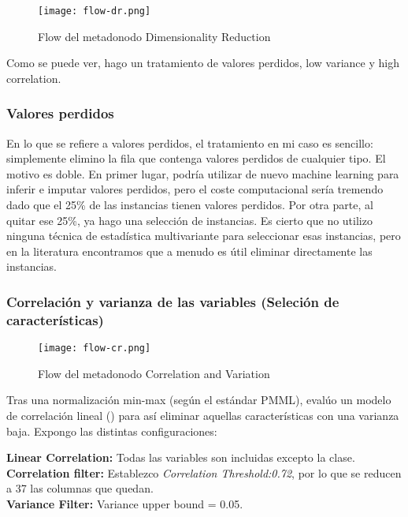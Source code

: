 \begin{figure}[H] %
	\centering
	\texttt{[image: flow-dr.png]}  %
	\caption{Flow del metadonodo Dimensionality Reduction} 
	\label{fig:flow-dr}
\end{figure}

Como se puede ver, hago un tratamiento de valores perdidos, low variance y high correlation.

\subsubsection{Valores perdidos}

En lo que se refiere a valores perdidos, el tratamiento en mi caso es sencillo: simplemente elimino la fila que contenga valores perdidos de cualquier tipo. El motivo es doble. En primer lugar, podría utilizar de nuevo machine learning para inferir e imputar valores perdidos, pero el coste computacional sería tremendo dado que el 25\% de las instancias tienen valores perdidos. Por otra parte, al quitar ese 25\%, ya hago una selección de instancias. Es cierto que no utilizo ninguna técnica de estadística multivariante para seleccionar esas instancias, pero en la literatura encontramos que a menudo es útil eliminar directamente las instancias.

\subsubsection{Correlación y varianza de las variables (Seleción de características)}

\begin{figure}[H] %
	\centering
	\texttt{[image: flow-cr.png]}  %
	\caption{Flow del metadonodo Correlation and Variation} 
	\label{fig:flow-cv}
\end{figure}

Tras una normalización min-max (según el estándar PMML), evalúo un modelo de correlación lineal (\cite{cf}) para así eliminar aquellas características con una varianza baja. Expongo las distintas configuraciones:

\textbf{Linear Correlation:} Todas las variables son incluidas excepto la clase.\\
\textbf{Correlation filter:} Establezco \textit{Correlation Threshold:0.72}, por lo que se reducen a 37 las columnas que quedan. \\
\textbf{Variance Filter:} Variance upper bound = 0.05.

